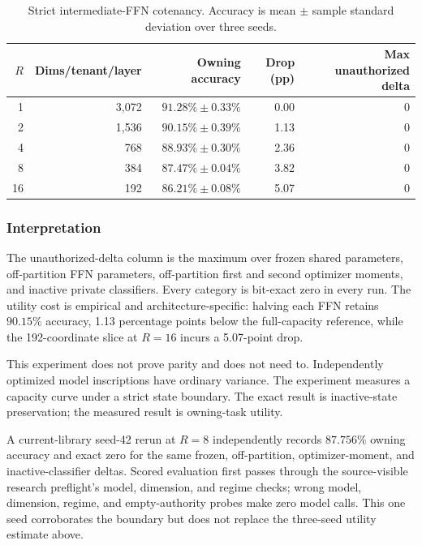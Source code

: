 \documentclass[11pt]{article}
\begin{document}
\begin{table}[ht]
\centering
\caption{Strict intermediate-FFN cotenancy. Accuracy is mean $\pm$ sample
standard deviation over three seeds.}
\label{tab:strict}
\small
\begin{tabular}{@{}rrrrr@{}}
\toprule
$R$ & Dims/tenant/layer & Owning accuracy & Drop (pp) & Max unauthorized delta \\
\midrule
1  & 3,072 & $91.28\%\pm0.33\%$ & 0.00 & 0 \\
2  & 1,536 & $90.15\%\pm0.39\%$ & 1.13 & 0 \\
4  &   768 & $88.93\%\pm0.30\%$ & 2.36 & 0 \\
8  &   384 & $87.47\%\pm0.04\%$ & 3.82 & 0 \\
16 &   192 & $86.21\%\pm0.08\%$ & 5.07 & 0 \\
\bottomrule
\end{tabular}
\end{table}

\subsubsection{Interpretation}

The unauthorized-delta column is the maximum over frozen shared parameters,
off-partition FFN parameters, off-partition first and second optimizer moments,
and inactive private classifiers. Every category is bit-exact zero in every
run. The utility cost is empirical and architecture-specific: halving each FFN
retains $90.15\%$ accuracy, 1.13 percentage points below the full-capacity
reference, while the 192-coordinate slice at $R=16$ incurs a 5.07-point drop.

This experiment does not prove parity and does not need to. Independently
optimized model inscriptions have ordinary variance. The experiment measures a
capacity curve under a strict state boundary. The exact result is inactive-state
preservation; the measured result is owning-task utility.

A current-library seed-42 rerun at $R=8$ independently records $87.756\%$
owning accuracy and exact zero for the same frozen, off-partition,
optimizer-moment, and inactive-classifier deltas. Scored evaluation first
passes through the source-visible research preflight's model, dimension, and regime checks;
wrong model, dimension, regime, and empty-authority probes make zero model
calls. This one seed corroborates the boundary but does not replace the
three-seed utility estimate above.
\end{document}
